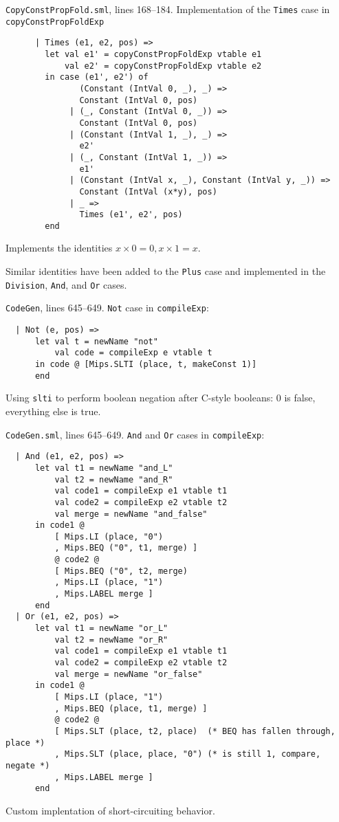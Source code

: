 \documentclass[12pt, a4paper]{article}
\begin{document}
\texttt{CopyConstPropFold.sml}, lines 168--184. Implementation of the
\texttt{Times} case in \texttt{copyConstPropFoldExp}
\begin{lstlisting}
      | Times (e1, e2, pos) =>
        let val e1' = copyConstPropFoldExp vtable e1
            val e2' = copyConstPropFoldExp vtable e2
        in case (e1', e2') of
               (Constant (IntVal 0, _), _) =>
               Constant (IntVal 0, pos)
             | (_, Constant (IntVal 0, _)) =>
               Constant (IntVal 0, pos)
             | (Constant (IntVal 1, _), _) =>
               e2'
             | (_, Constant (IntVal 1, _)) =>
               e1'
             | (Constant (IntVal x, _), Constant (IntVal y, _)) =>
               Constant (IntVal (x*y), pos)
             | _ =>
               Times (e1', e2', pos)
        end
\end{lstlisting}
Implements the identities $x\times0=0, x\times1=x$.

Similar identities have been added to the \texttt{Plus} case and
implemented in the \texttt{Division}, \texttt{And}, and \texttt{Or}
cases.

\texttt{CodeGen}, lines 645--649. \texttt{Not} case in \texttt{compileExp}:
\begin{lstlisting}
  | Not (e, pos) =>
      let val t = newName "not"
          val code = compileExp e vtable t
      in code @ [Mips.SLTI (place, t, makeConst 1)]
      end
\end{lstlisting}
Using \texttt{slti} to perform boolean negation after C-style booleans: 0 is false, everything
else is true.


\texttt{CodeGen.sml}, lines 645--649. \texttt{And} and \texttt{Or} cases in \texttt{compileExp}:
\begin{lstlisting}
  | And (e1, e2, pos) =>
      let val t1 = newName "and_L"
          val t2 = newName "and_R"
          val code1 = compileExp e1 vtable t1
          val code2 = compileExp e2 vtable t2
          val merge = newName "and_false"
      in code1 @
          [ Mips.LI (place, "0")
          , Mips.BEQ ("0", t1, merge) ]
          @ code2 @
          [ Mips.BEQ ("0", t2, merge)
          , Mips.LI (place, "1")
          , Mips.LABEL merge ]
      end
  | Or (e1, e2, pos) =>
      let val t1 = newName "or_L"
          val t2 = newName "or_R"
          val code1 = compileExp e1 vtable t1
          val code2 = compileExp e2 vtable t2
          val merge = newName "or_false"
      in code1 @
          [ Mips.LI (place, "1")
          , Mips.BEQ (place, t1, merge) ]
          @ code2 @
          [ Mips.SLT (place, t2, place)  (* BEQ has fallen through, place *)
          , Mips.SLT (place, place, "0") (* is still 1, compare, negate *)
          , Mips.LABEL merge ]
      end
\end{lstlisting}
Custom implentation of short-circuiting behavior.
\end{document}
